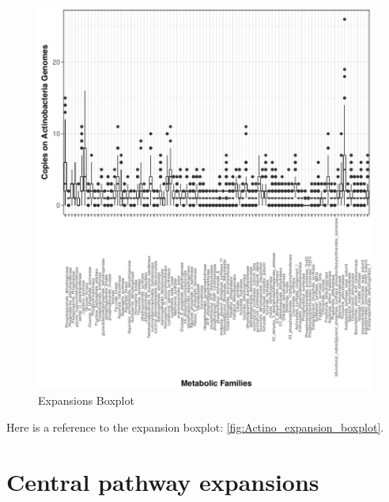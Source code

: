 \documentclass[12pt,twoside]{reedthesis}
\begin{document}
  \begin{Shaded}
  \begin{Highlighting}[]
  \NormalTok{(} \NormalTok{, } \NormalTok{,} \NormalTok{, } \NormalTok{)}
  \end{Highlighting}
  \end{Shaded}
  
  \begin{figure}[h!tbp]
  \centering
  \includegraphics[angle = 0,scale = 1]{chapter4/expansion_plotActinos.pdf}
  \caption[Expansions Boxplot]{\normalsize{Expansions Boxplot}}
  \label{fig:Actino_expansion_boxplot}
  \end{figure}
  
  Here is a reference to the expansion boxplot:
  \autoref{fig:Actino_expansion_boxplot}.\\
  \clearpage 
  
  \section{Central pathway expansions}\label{central-pathway-expansions-1}
  
\end{document}
